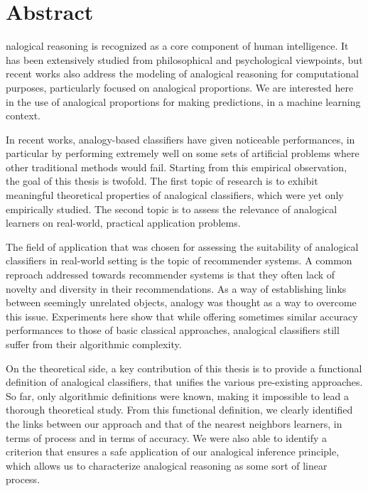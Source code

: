 \chapter*{Abstract}

nalogical reasoning is recognized as a core component of human
intelligence. It has been extensively studied from philosophical and
psychological viewpoints, but recent works also address the modeling of
analogical reasoning for computational purposes, particularly focused on
analogical proportions. We are interested here in the use of analogical
proportions for making predictions, in a machine learning context.

In recent works, analogy-based classifiers have given noticeable performances,
in particular by performing extremely well on some sets of artificial problems
where other traditional methods would fail. Starting from this empirical
observation, the goal of this thesis is twofold. The first topic of research is
to exhibit meaningful theoretical properties of analogical classifiers, which
were yet only empirically studied.  The second topic is to assess the relevance
of analogical learners on real-world, practical application problems.

The field of application that was chosen for assessing the suitability of
analogical classifiers in real-world setting is the topic of recommender
systems. A common reproach addressed towards recommender systems is that they
often lack of novelty and diversity in their recommendations. As a way of
establishing links between seemingly unrelated objects, analogy was thought as
a way to overcome this issue. Experiments here show that while offering
sometimes similar accuracy performances to those of basic classical approaches,
analogical classifiers still suffer from their algorithmic complexity.

On the theoretical side, a key contribution of this thesis is to provide a
functional definition of analogical classifiers, that unifies the various
pre-existing approaches. So far, only algorithmic definitions were known, making
it impossible to lead a thorough theoretical study. From this functional
definition, we clearly identified the links between our approach and that of
the nearest neighbors learners, in terms of process and in terms of accuracy.
We were also able to identify a criterion that ensures a safe application of our
analogical inference principle, which allows us to characterize analogical
reasoning as some sort of linear process.
\newpage


